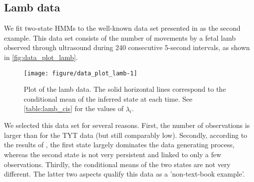 \documentclass[bimj,fleqn]{w-art}\usepackage[]{graphicx}\usepackage[]{color}
\makeatletter
\def\maxwidth{ %
  \ifdim\Gin@nat@width>\linewidth
    \linewidth
  \else
    \Gin@nat@width
  \fi
}
\newenvironment{knitrout}{}{} %
\theoremstyle{plain}
\theoremstyle{definition}
\makeatother
\begin{document}
\subsection{Lamb data}
\label{sec:lamb_data}

We fit two-state HMMs to the well-known data set presented in \citet{leroux} as the second example. This data set consists of the number of movements by a fetal lamb observed through ultrasound during 240 consecutive 5-second intervals, as shown in \autoref{fig:data_plot_lamb}. 

\begin{knitrout}
\color{fgcolor}\begin{figure}[htb]

{\centering \texttt{[image: figure/data\_plot\_lamb-1]} 

}

\caption{Plot of the lamb data. The solid horizontal lines correspond to the conditional mean of the inferred state at each time. See \autoref{table:lamb_cis} for the values of $\widehat{\lambda}_i$.}\label{fig:data_plot_lamb}
\end{figure}

\end{knitrout}

We selected this data set for several reasons. First, the number of observations is larger than for the TYT data (but still comparably low). Secondly, according to the results of \citet{leroux}, the first state largely dominates the data generating process, whereas the second state is not very persistent and linked to only a few observations. Thirdly, the conditional means of the two states are not very different. The latter two aspects qualify this data as a 'non-text-book example'.
\end{document}
